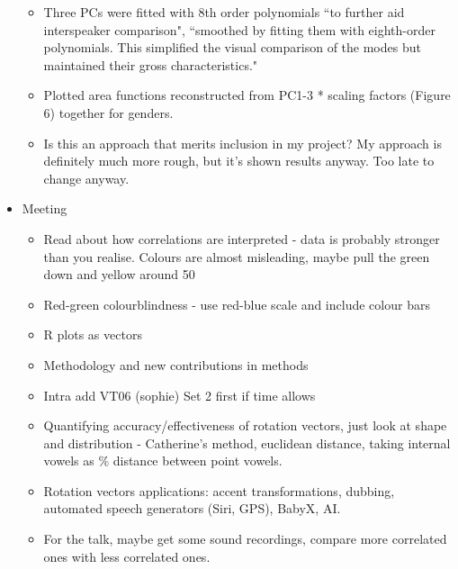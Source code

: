\documentclass{article}
\begin{document}
\begin{itemize}
\begin{itemize}
        \item Three PCs were fitted with 8th order polynomials ``to further aid interspeaker comparison", ``smoothed by fitting them with eighth-order polynomials. This simplified the visual comparison of the modes but maintained their gross characteristics."
        \item Plotted area functions reconstructed from PC1-3 * scaling factors (Figure 6) together for genders.
        \item Is this an approach that merits inclusion in my project? My approach is definitely much more rough, but it’s shown results anyway. Too late to change anyway.
    \end{itemize}
    \item Meeting
    \begin{itemize}
        \item Read about how correlations are interpreted - data is probably stronger than you realise. Colours are almost misleading, maybe pull the green down and yellow around 50
        \item Red-green colourblindness - use red-blue scale and include colour bars
        \item R plots as vectors
        \item Methodology and new contributions in methods
        \item Intra add VT06 (sophie) Set 2 first if time allows
        \item Quantifying accuracy/effectiveness of rotation vectors, just look at shape and distribution - Catherine's method, euclidean distance, taking internal vowels as \% distance between point vowels.
        \item Rotation vectors applications: accent transformations, dubbing, automated speech generators (Siri, GPS), BabyX, AI.
        \item For the talk, maybe get some sound recordings, compare more correlated ones with less correlated ones.
    \end{itemize}
\end{itemize}
\end{document}
